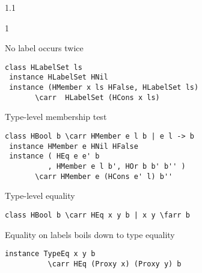 \documentclass{slides}
\newenvironment{myslide}{\begin{slide}\color{Blue}\begin{boxedminipage}{1.1\hsize}\begin{boxedminipage}{1\hsize}\color{Black}
\vspace{-170\in}
}{%
\smallskip
\end{boxedminipage}
\end{boxedminipage}
\end{slide}}
\newenvironment{myslide}{\begin{slide}
}{%
\end{slide}}
\newenvironment{myslide}{\begin{slide}\color{White}\begin{boxedminipage}{1.1\hsize}\color{Black}
\vspace{-170\in}
}{%
\smallskip
\end{boxedminipage}
\end{slide}}
\newcommand{\blau}[1]{{\vspace{-50\in}\normalsize \color{Blue} #1}}
\newcommand{\farr}{\ensuremath{\to}}
\newcommand{\carr}{\ensuremath{\Rightarrow}}
\begin{document}
\begin{myslide}

\bigskip
\bigskip

\blau{No label occurs twice}

\smallskip

\begin{Verbatim}[fontfamily=courier,fontsize=\small,commandchars=\\\{\}]
 class HLabelSet ls
 instance HLabelSet HNil
 instance (HMember x ls HFalse, HLabelSet ls)
       \carr  HLabelSet (HCons x ls)
\end{Verbatim}

\vspace{-77\in}

\blau{Type-level membership test}

\smallskip

\begin{Verbatim}[fontfamily=courier,fontsize=\small,commandchars=\\\{\}]
 class HBool b \carr HMember e l b | e l -> b
 instance HMember e HNil HFalse
 instance ( HEq e e' b
          , HMember e l b', HOr b b' b'' )
       \carr HMember e (HCons e' l) b''
\end{Verbatim}

\vspace{-77\in}

\blau{Type-level equality}

\smallskip

\begin{Verbatim}[fontfamily=courier,fontsize=\small,commandchars=\\\{\}]
 class HBool b \carr HEq x y b | x y \farr b
\end{Verbatim}

\vspace{-77\in}

\blau{Equality on labels boils down to type equality}

\smallskip

\begin{Verbatim}[fontfamily=courier,fontsize=\small,commandchars=\\\{\}]
 instance TypeEq x y b
          \carr HEq (Proxy x) (Proxy y) b
\end{Verbatim}

\end{myslide}



\end{document}
